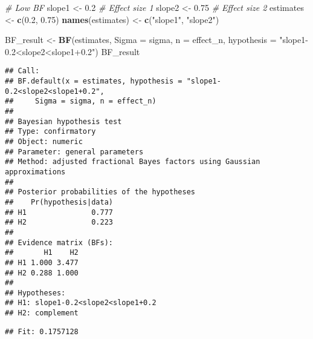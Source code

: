 \documentclass[
]{article}
\newenvironment{Shaded}{\begin{snugshade}}{\end{snugshade}}
\newcommand{\AttributeTok}[1]{\textcolor[rgb]{0.13,0.29,0.53}{#1}}
\newcommand{\CommentTok}[1]{\textcolor[rgb]{0.56,0.35,0.01}{\textit{#1}}}
\newcommand{\DecValTok}[1]{\textcolor[rgb]{0.00,0.00,0.81}{#1}}
\newcommand{\FloatTok}[1]{\textcolor[rgb]{0.00,0.00,0.81}{#1}}
\newcommand{\FunctionTok}[1]{\textcolor[rgb]{0.13,0.29,0.53}{\textbf{#1}}}
\newcommand{\NormalTok}[1]{#1}
\newcommand{\OtherTok}[1]{\textcolor[rgb]{0.56,0.35,0.01}{#1}}
\newcommand{\SpecialCharTok}[1]{\textcolor[rgb]{0.81,0.36,0.00}{\textbf{#1}}}
\newcommand{\StringTok}[1]{\textcolor[rgb]{0.31,0.60,0.02}{#1}}
\begin{document}
\begin{Shaded}
\begin{Highlighting}[]
\CommentTok{\# Low BF}
\NormalTok{slope1 }\OtherTok{\textless{}{-}} \FloatTok{0.2} \CommentTok{\# Effect size 1}
\NormalTok{slope2 }\OtherTok{\textless{}{-}} \FloatTok{0.75} \CommentTok{\# Effect size 2}
\NormalTok{estimates }\OtherTok{\textless{}{-}} \FunctionTok{c}\NormalTok{(}\FloatTok{0.2}\NormalTok{, }\FloatTok{0.75}\NormalTok{)}
\FunctionTok{names}\NormalTok{(estimates) }\OtherTok{\textless{}{-}} \FunctionTok{c}\NormalTok{(}\StringTok{"slope1"}\NormalTok{, }\StringTok{"slope2"}\NormalTok{)}

\NormalTok{BF\_result }\OtherTok{\textless{}{-}} \FunctionTok{BF}\NormalTok{(estimates, }\AttributeTok{Sigma =}\NormalTok{ sigma, }\AttributeTok{n =}\NormalTok{ effect\_n, }\AttributeTok{hypothesis =} \StringTok{"slope1{-}0.2\textless{}slope2\textless{}slope1+0.2"}\NormalTok{)}
\NormalTok{BF\_result}
\end{Highlighting}
\end{Shaded}

\begin{verbatim}
## Call:
## BF.default(x = estimates, hypothesis = "slope1-0.2<slope2<slope1+0.2", 
##     Sigma = sigma, n = effect_n)
## 
## Bayesian hypothesis test
## Type: confirmatory
## Object: numeric
## Parameter: general parameters
## Method: adjusted fractional Bayes factors using Gaussian approximations
## 
## Posterior probabilities of the hypotheses
##    Pr(hypothesis|data)
## H1               0.777
## H2               0.223
## 
## Evidence matrix (BFs):
##       H1    H2
## H1 1.000 3.477
## H2 0.288 1.000
## 
## Hypotheses:
## H1: slope1-0.2<slope2<slope1+0.2
## H2: complement
\end{verbatim}

\begin{Shaded}
\end{Shaded}

\begin{verbatim}
## Fit: 0.1757128
\end{verbatim}

\begin{Shaded}
\end{Shaded}
\end{document}
